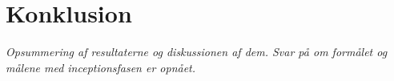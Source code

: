 \section{Konklusion}
\textit{Opsummering af resultaterne og diskussionen af dem. Svar på om formålet og målene med inceptionsfasen er opnået.}
